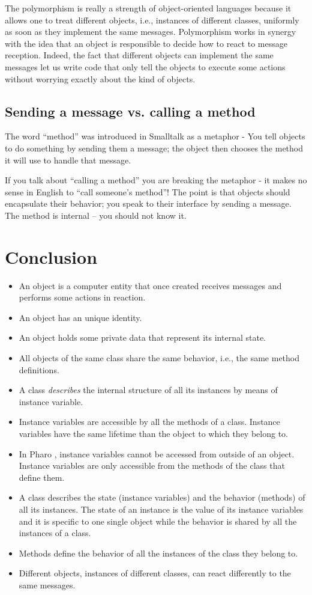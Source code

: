 \documentclass[10pt,twoside,english]{_support/latex/sbabook/sbabook}
\begin{document}
The  polymorphism is really a strength of object-oriented languages because it allows one to treat different objects, i.e., instances of different classes, uniformly as soon as they implement the same messages. Polymorphism works in synergy with the idea that an object is responsible to decide how to react to message reception. Indeed, the fact that different objects can implement the same messages let us write code that only tell the objects to execute some actions without worrying exactly about the kind of objects. 
\subsection{Sending a message vs. calling a method}
The word “method” was introduced in Smalltalk as a metaphor - You tell objects to do something by sending them a message; the object then chooses the method it will use to handle that message.

If you talk about “calling a method” you are breaking the metaphor - it makes no sense in English to “call someone’s method”!
The point is that objects should encapsulate their behavior; you speak to their interface by sending a message. The method is internal – you should not know it.
\section{Conclusion }
\begin{itemize}
\item An object is a computer entity that once created receives messages and performs some actions in reaction.
\item An object has an unique identity.
\item An object holds some private data that represent its internal state.
\item All objects of the same class share the same behavior, i.e., the same method definitions.
\item A class \textit{describes} the internal structure of all its instances by means of instance variable.
\item Instance variables are accessible by all the methods of a class. Instance variables have the same lifetime than the object to which they belong to.
\item In Pharo , instance variables cannot be accessed from outside of an object. Instance variables are only accessible from the methods of the class that define them.
\item A class describes the state (instance variables) and the behavior (methods) of all its instances. The state of an instance is the value of its instance variables and it is specific to one single object while the behavior is shared by all the instances of a class.
\item Methods define the behavior of all the instances  of the class they belong to.
\item Different objects, instances of different classes, can react differently to the same messages.
\end{itemize}


\backmatter



\end{document}
